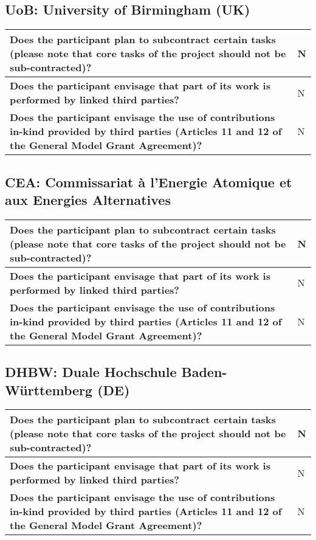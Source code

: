 \subsection*{UoB: University of Birmingham (UK)}

\begin{longtable*}{|p{0.75\textwidth}|p{0.2\textwidth}|}
\hline
{\bf Does the participant plan to subcontract certain tasks (please
  note that core tasks of the project should not be sub-contracted)?}
&
N
\\
\hline
{\bf Does the participant envisage that  part of its work is performed
  by linked third parties?}
&
N
\\
\hline
{\bf Does the participant envisage the use of contributions in-kind
provided by third parties (Articles 11 and 12 of the General Model
Grant Agreement)?}
&
N
\\
\hline
\end{longtable*}


\subsection*{CEA: Commissariat à l’Energie Atomique et aux Energies
  Alternatives}
\begin{longtable*}{|p{0.75\textwidth}|p{0.2\textwidth}|}
\hline
{\bf Does the participant plan to subcontract certain tasks (please
  note that core tasks of the project should not be sub-contracted)?}
&
N
\\
\hline
{\bf Does the participant envisage that  part of its work is performed
  by linked third parties?}
&
N
\\
\hline
{\bf Does the participant envisage the use of contributions in-kind
provided by third parties (Articles 11 and 12 of the General Model
Grant Agreement)?}
&
N
\\
\hline
\end{longtable*}



\subsection*{DHBW: Duale Hochschule Baden-Württemberg (DE)}

\begin{longtable*}{|p{0.75\textwidth}|p{0.2\textwidth}|}
\hline
{\bf Does the participant plan to subcontract certain tasks (please
  note that core tasks of the project should not be sub-contracted)?}
&
N
\\
\hline
{\bf Does the participant envisage that  part of its work is performed
  by linked third parties?}
&
N
\\
\hline
{\bf Does the participant envisage the use of contributions in-kind
provided by third parties (Articles 11 and 12 of the General Model
Grant Agreement)?}
&
N
\\
\hline
\end{longtable*}


